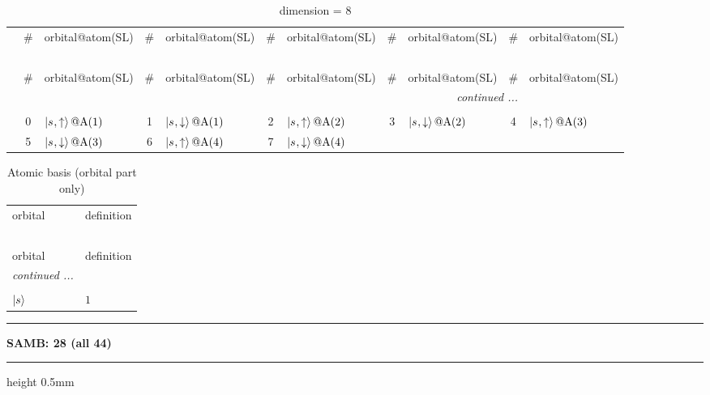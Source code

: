 \documentclass[fleqn,10pt,landscape]{jsarticle}
\begin{document}
\renewcommand{\arraystretch}{1.6}
\begin{longtable}[l]{c|cl|cl|cl|cl|cl}
\captionsetup{justification=raggedright, singlelinecheck=off}
\caption{dimension = 8}
 \\
 \hline \hline
 & \# & orbital@atom(SL) & \# & orbital@atom(SL) & \# & orbital@atom(SL) & \# & orbital@atom(SL) & \# & orbital@atom(SL) \\ \hline \endfirsthead

\multicolumn{10}{l}{\tablename\ \thetable{}} \\
 \hline \hline
 & \# & orbital@atom(SL) & \# & orbital@atom(SL) & \# & orbital@atom(SL) & \# & orbital@atom(SL) & \# & orbital@atom(SL) \\ \hline \endhead

 \hline \hline
\multicolumn{10}{r}{\footnotesize\it continued ...} \\ \endfoot

 \hline \hline
\multicolumn{10}{r}{} \\ \endlastfoot

 & 0 & $\ket{s_{},\uparrow}@{\rm A}(1)$ & 1 & $\ket{s_{},\downarrow}@{\rm A}(1)$ & 2 & $\ket{s_{},\uparrow}@{\rm A}(2)$ & 3 & $\ket{s_{},\downarrow}@{\rm A}(2)$ & 4 & $\ket{s_{},\uparrow}@{\rm A}(3)$ \\
& 5 & $\ket{s_{},\downarrow}@{\rm A}(3)$ & 6 & $\ket{s_{},\uparrow}@{\rm A}(4)$ & 7 & $\ket{s_{},\downarrow}@{\rm A}(4)$ &  &  &  &  \\
\end{longtable}
\renewcommand{\arraystretch}{1.6}
\begin{longtable}[l]{ll}
\captionsetup{justification=raggedright, singlelinecheck=off}
\caption{Atomic basis (orbital part only)}
 \\
 \hline \hline
orbital & definition \\ \hline \endfirsthead

\multicolumn{1}{l}{\tablename\ \thetable{}} \\
 \hline \hline
orbital & definition \\ \hline \endhead

 \hline \hline
\multicolumn{1}{r}{\footnotesize\it continued ...} \\ \endfoot

 \hline \hline
\multicolumn{1}{r}{} \\ \endlastfoot

$ \ket{s} $ & $ 1 $ \\
\end{longtable}
\vspace{5mm}
\noindent \rule[0.5mm]{5mm}{0.5mm}\hspace{3mm}\textbf{SAMB: 28 (all 44)}\hspace{3mm}\leaders\hrule height 0.5mm\hfill\kern0pt
\vspace{3mm}
\end{document}
